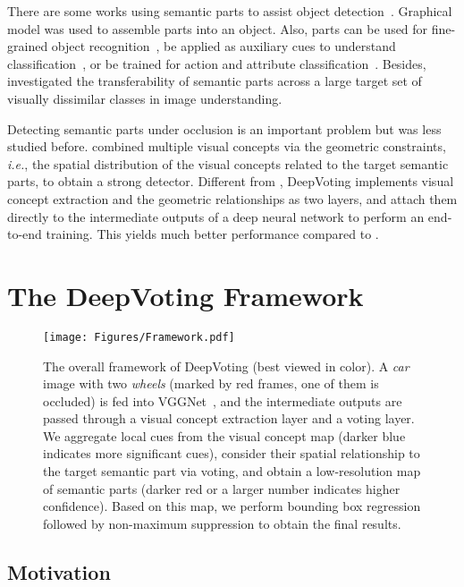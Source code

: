 \documentclass[10pt,twocolumn,letterpaper]{article}
\begin{document}
  There are some works using semantic parts to assist object detection~\cite{chen2014detect,Zhu_2015_DeePM}. Graphical model was used to assemble parts into an object. Also, parts can be used for fine-grained object recognition~\cite{Zhang_2014_Part, zhang2016spda}, be applied as auxiliary cues to understand classification~\cite{Huang_2016_Part}, or be trained for action and attribute classification~\cite{gkioxari2015actions}. Besides, \cite{novotny2016have} investigated the transferability of semantic parts across a large  target  set  of  visually  dissimilar  classes in image understanding.

  Detecting semantic parts under occlusion is an important problem but was less studied before. \cite{wang2017detecting} combined multiple visual concepts via the geometric constraints, {\em i.e.}, the spatial distribution of the visual concepts related to the target semantic parts, to obtain a strong detector. Different from \cite{wang2017detecting}, DeepVoting implements visual concept extraction and the geometric relationships as two layers, and attach them directly to the intermediate outputs of a deep neural network to perform an end-to-end training. This yields much better performance compared to \cite{wang2017detecting}.


  \section{The DeepVoting Framework}
  \label{Framework}

  \begin{figure*}[t!]
  \centering
  \texttt{[image: Figures/Framework.pdf]}
  \caption{
  The overall framework of DeepVoting (best viewed in color). A {\em car} image with two {\em wheels} (marked by red frames, one of them is occluded) is fed into VGGNet~\cite{Simonyan_2015_Very}, and the intermediate outputs are passed through a visual concept extraction layer and a voting layer. We aggregate local cues from the visual concept map (darker blue indicates more significant cues), consider their spatial relationship to the target semantic part via voting, and obtain a low-resolution map of semantic parts (darker red or a larger number indicates higher confidence). Based on this map, we perform bounding box regression followed by non-maximum suppression to obtain the final results.
  }
  \label{Fig:Framework}
  \end{figure*}


  \subsection{Motivation}
  \label{Framework:Motivation}
\end{document}
